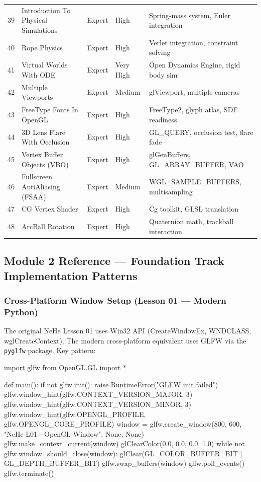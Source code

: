 \documentclass[11pt,letterpaper]{article}
\begin{document}
\begin{center}
\begin{longtable}{C{1.2cm}L{4.8cm}L{2cm}L{1.4cm}X}
39 & Introduction To Physical Simulations & Expert & High & Spring-mass system, Euler integration \\
40 & Rope Physics & Expert & High & Verlet integration, constraint solving \\
41 & Virtual Worlds With ODE & Expert & Very High & Open Dynamics Engine, rigid body sim \\
42 & Multiple Viewports & Expert & Medium & glViewport, multiple cameras \\
43 & FreeType Fonts In OpenGL & Expert & High & FreeType2, glyph atlas, SDF readiness \\
44 & 3D Lens Flare With Occlusion & Expert & High & GL\_QUERY, occlusion test, flare fade \\
45 & Vertex Buffer Objects (VBO) & Expert & High & glGenBuffers, GL\_ARRAY\_BUFFER, VAO \\
46 & Fullscreen AntiAliasing (FSAA) & Expert & Medium & WGL\_SAMPLE\_BUFFERS, multisampling \\
47 & CG Vertex Shader & Expert & High & Cg toolkit, GLSL translation \\
48 & ArcBall Rotation & Expert & High & Quaternion math, trackball interaction \\
\bottomrule
\end{longtable}
\end{center}

\subsection{Module 2 Reference --- Foundation Track Implementation Patterns}

\subsubsection{Cross-Platform Window Setup (Lesson 01 --- Modern Python)}

The original NeHe Lesson 01 uses Win32 API (CreateWindowEx, WNDCLASS, wglCreateContext). The modern cross-platform equivalent uses GLFW via the \texttt{pyglfw} package. Key pattern:

\begin{codebox}
import glfw
from OpenGL.GL import *

def main():
    if not glfw.init():
        raise RuntimeError("GLFW init failed")
    glfw.window_hint(glfw.CONTEXT_VERSION_MAJOR, 3)
    glfw.window_hint(glfw.CONTEXT_VERSION_MINOR, 3)
    glfw.window_hint(glfw.OPENGL_PROFILE, glfw.OPENGL_CORE_PROFILE)
    window = glfw.create_window(800, 600, "NeHe L01 - OpenGL Window", None, None)
    glfw.make_context_current(window)
    glClearColor(0.0, 0.0, 0.0, 1.0)
    while not glfw.window_should_close(window):
        glClear(GL_COLOR_BUFFER_BIT | GL_DEPTH_BUFFER_BIT)
        glfw.swap_buffers(window)
        glfw.poll_events()
    glfw.terminate()
\end{codebox}
\end{document}
